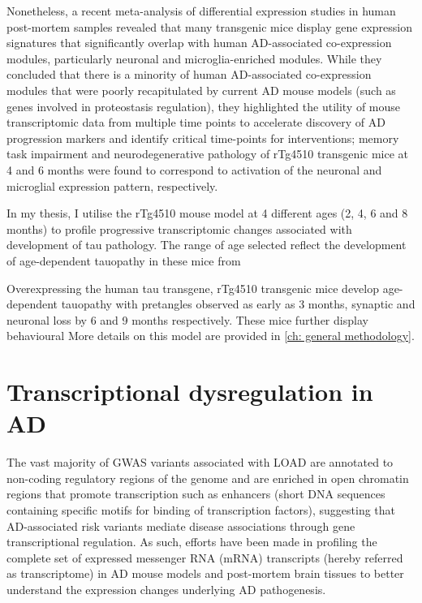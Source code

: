 Nonetheless, a recent meta-analysis of differential expression studies in human post-mortem samples revealed that many transgenic mice display gene expression signatures that significantly overlap with human AD-associated co-expression modules, particularly neuronal and microglia-enriched modules\cite{Wan2020}. While they concluded that there is a minority of human AD-associated co-expression modules that were poorly recapitulated by current AD mouse models (such as genes involved in proteostasis regulation), they highlighted the utility of mouse transcriptomic data from multiple time points to accelerate discovery of AD progression markers and identify critical time-points for interventions; memory task impairment and neurodegenerative pathology of rTg4510 transgenic mice at 4 and 6 months were found to correspond to activation of the neuronal and microglial expression pattern, respectively. 

In my thesis, I utilise the rTg4510 mouse model at 4 different ages (2, 4, 6 and 8 months) to profile progressive transcriptomic changes associated with development of tau pathology. The range of age selected reflect the development of age-dependent tauopathy in these mice from 

Overexpressing the human tau transgene, rTg4510 transgenic mice develop age-dependent tauopathy with pretangles observed as early as 3 months, synaptic and neuronal loss by 6 and 9 months respectively. These mice further display behavioural More details on this model are provided in \cref{ch: general methodology}. 


\clearpage
\section{Transcriptional dysregulation in AD}

The vast majority of GWAS variants associated with LOAD are annotated to non-coding regulatory regions of the genome and are enriched in open chromatin regions that promote transcription such as enhancers\cite{Kikuchi2019} (short DNA sequences containing specific motifs for binding of transcription factors), suggesting that AD-associated risk variants mediate disease associations through gene transcriptional regulation. As such, efforts have been made in profiling the complete set of expressed messenger RNA (mRNA) transcripts (hereby referred as transcriptome) in AD mouse models and post-mortem brain tissues to better understand the expression changes underlying AD pathogenesis. 

